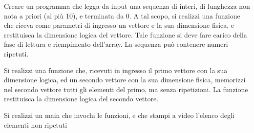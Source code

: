 \begin{Exercise}[label={ex:ripetizioni}]
    Creare un programma che legga da input una sequenza di interi, di lunghezza non nota a priori (al più 10), e terminata da 0. A tal scopo, si
    realizzi una funzione che riceva come parametri di ingresso un vettore e la sua dimensione fisica, e restituisca la dimensione logica del
    vettore. Tale funzione si deve fare carico della fase di lettura e riempimento dell’array. La sequenza può contenere numeri ripetuti.

    Si realizzi una funzione che, ricevuti in ingresso il primo vettore con la sua dimensione logica, ed un secondo vettore con la sua dimensione
    fisica, memorizzi nel secondo vettore tutti gli elementi del primo, ma senza ripetizioni. La funzione restituisca la dimensione logica del
    secondo vettore.

    Si realizzi un main che invochi le funzioni, e che stampi a video l’elenco degli elementi non ripetuti
\end{Exercise}

\begin{Answer}[ref={ex:ripetizioni}]
  	
\end{Answer}